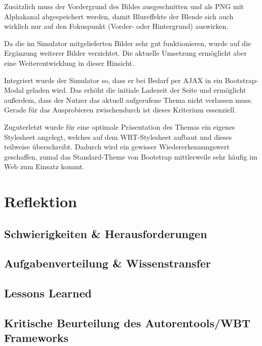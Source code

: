 \documentclass{article}
\begin{document}
Zus\"atzlich muss der Vordergrund des Bildes ausgeschnitten und als PNG mit Alphakanal abgespeichert werden, damit Blureffekte der Blende sich auch wirklich nur auf den Fokuspunkt (Vorder- oder Hintergrund) auswirken.

Da die im Simulator mitgelieferten Bilder sehr gut funktionieren, wurde auf die Erg\"anzung weiterer Bilder verzichtet. Die aktuelle Umsetzung erm\"oglicht aber eine Weiterentwicklung in dieser Hinsicht.

Integriert wurde der Simulator so, dass er bei Bedarf per AJAX in ein Bootstrap-Modal geladen wird. Das erh\"oht die initiale Ladezeit der Seite und erm\"oglicht au{\ss}erdem, dass der Nutzer das aktuell aufgerufene Thema nicht verlassen muss. Gerade f\"ur das Ausprobieren zwischendurch ist dieses Kriterium essenziell.

Zuguterletzt wurde f\"ur eine optimale Pr\"asentation des Themas ein eigenes Stylesheet angelegt, welches auf dem WBT-Stylesheet aufbaut und dieses teilweise \"uberschreibt. Dadurch wird ein gewisser Wiedererkennungswert geschaffen, zumal das Standard-Theme von Bootstrap mittlerweile sehr h\"aufig im Web zum Einsatz kommt. 

\section{Reflektion}
\label{sec:reflektion}

\subsection{Schwierigkeiten \& Herausforderungen}


\subsection{Aufgabenverteilung \& Wissenstransfer}


\subsection{Lessons Learned}

\subsection{Kritische Beurteilung des Autorentools/WBT Frameworks}
\end{document}
